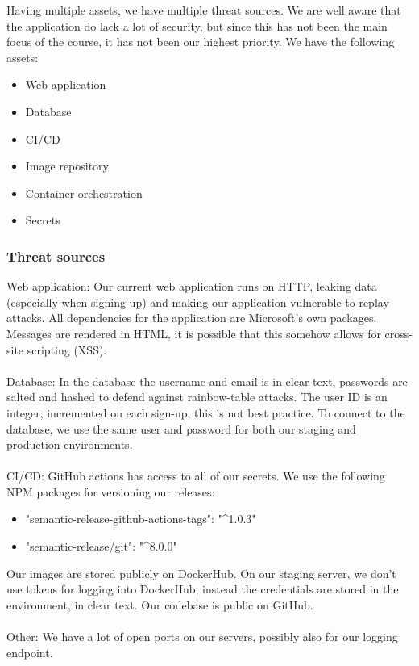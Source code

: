 
Having multiple assets, we have multiple threat sources. We are well aware that the application do lack a lot of security, but since this has not been the main focus of the course, it has not been our highest priority. \newline 
We have the following assets:
\begin{itemize}
    \item Web application
    \item Database
    \item CI/CD
    \item Image repository
    \item Container orchestration
    \item Secrets
\end{itemize}

\subsubsection{Threat sources}

Web application: Our current web application runs on HTTP, leaking data (especially when signing up) and making our application vulnerable to replay attacks. 
All dependencies for the application are Microsoft's own packages.
Messages are rendered in HTML, it is possible that this somehow allows for cross-site scripting (XSS).\\\\
Database: In the database the username and email is in clear-text, passwords are salted and hashed to defend against rainbow-table attacks.
The user ID is an integer, incremented on each sign-up, this is not best practice.
To connect to the database, we use the same user and password for both our staging and production environments.\\\\
CI/CD: GitHub actions has access to all of our secrets.
We use the following NPM packages for versioning our releases:
\begin{itemize}
    \item "semantic-release-github-actions-tags": "\textasciicircum1.0.3"
    \item "semantic-release/git": "\textasciicircum8.0.0"
\end{itemize}

Our images are stored publicly on DockerHub.
On our staging server, we don’t use tokens for logging into DockerHub, instead the credentials are stored in the environment, in clear text.
Our codebase is public on GitHub.\\\\
Other: We have a lot of open ports on our servers, possibly also for our logging endpoint.

